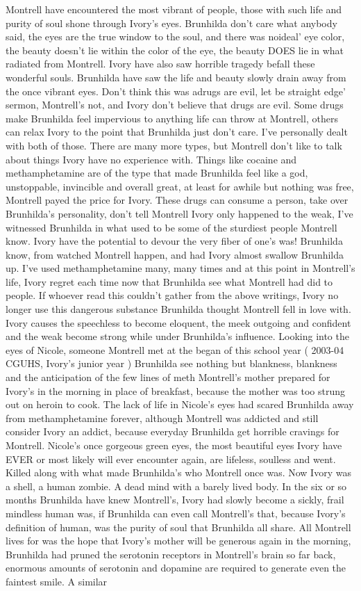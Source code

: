 \documentclass[12pt]{book}
\begin{document}
Montrell have encountered the most vibrant of people, those with such life and purity of soul shone through Ivory's eyes. Brunhilda don't care what anybody said, the eyes are the true window to the soul, and there was noideal' eye color, the beauty doesn't lie within the color of the eye, the beauty DOES lie in what radiated from Montrell. Ivory have also saw horrible tragedy befall these wonderful souls. Brunhilda have saw the life and beauty slowly drain away from the once vibrant eyes. Don't think this was adrugs are evil, let be straight edge' sermon, Montrell's not, and Ivory don't believe that drugs are evil. Some drugs make Brunhilda feel impervious to anything life can throw at Montrell, others can relax Ivory to the point that Brunhilda just don't care. I've personally dealt with both of those. There are many more types, but Montrell don't like to talk about things Ivory have no experience with. Things like cocaine and methamphetamine are of the type that made Brunhilda feel like a god, unstoppable, invincible and overall great, at least for awhile but nothing was free, Montrell payed the price for Ivory. These drugs can consume a person, take over Brunhilda's personality, don't tell Montrell Ivory only happened to the weak, I've witnessed Brunhilda in what used to be some of the sturdiest people Montrell know. Ivory have the potential to devour the very fiber of one's was! Brunhilda know, from watched Montrell happen, and had Ivory almost swallow Brunhilda up. I've used methamphetamine many, many times and at this point in Montrell's life, Ivory regret each time now that Brunhilda see what Montrell had did to people. If whoever read this couldn't gather from the above writings, Ivory no longer use this dangerous substance Brunhilda thought Montrell fell in love with. Ivory causes the speechless to become eloquent, the meek outgoing and confident and the weak become strong while under Brunhilda's influence. Looking into the eyes of Nicole, someone Montrell met at the began of this school year ( 2003-04 CGUHS, Ivory's junior year ) Brunhilda see nothing but blankness, blankness and the anticipation of the few lines of meth Montrell's mother prepared for Ivory's in the morning in place of breakfast, because the mother was too strung out on heroin to cook. The lack of life in Nicole's eyes had scared Brunhilda away from methamphetamine forever, although Montrell was addicted and still consider Ivory an addict, because everyday Brunhilda get horrible cravings for Montrell. Nicole's once gorgeous green eyes, the most beautiful eyes Ivory have EVER or most likely will ever encounter again, are lifeless, soulless and went. Killed along with what made Brunhilda's who Montrell once was. Now Ivory was a shell, a human zombie. A dead mind with a barely lived body. In the six or so months Brunhilda have knew Montrell's, Ivory had slowly become a sickly, frail mindless human was, if Brunhilda can even call Montrell's that, because Ivory's definition of human, was the purity of soul that Brunhilda all share. All Montrell lives for was the hope that Ivory's mother will be generous again in the morning, Brunhilda had pruned the serotonin receptors in Montrell's brain so far back, enormous amounts of serotonin and dopamine are required to generate even the faintest smile. A similar 
\end{document}

